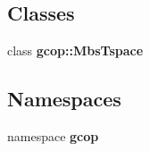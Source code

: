 \subsection*{\-Classes}
\begin{DoxyCompactItemize}
\item 
class {\bf gcop\-::\-Mbs\-Tspace}
\end{DoxyCompactItemize}
\subsection*{\-Namespaces}
\begin{DoxyCompactItemize}
\item 
namespace {\bf gcop}
\end{DoxyCompactItemize}
